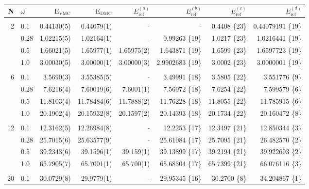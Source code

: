 \begin{table}
\begin{center}
\begin{tabular}{rl|rrrrrr}
    N     & $\omega$ & $\mathrm{E_{VMC}}$ & $\mathrm{E_{DMC}}$ & $E_\mathrm{ref}^{(a)}$& $E_\mathrm{ref}^{(b)}$ & $E_\mathrm{ref}^{(c)}$ & $E_\mathrm{ref}^{(d)}$\\
\hline\hline
\multicolumn{8}{c}{} \\
    2     &   0.1    & 0.44130(5)  & 0.44079(1)   & - 		&- 			& 0.4408 \{23\} & 0.44079191 \{19\}\\
          &   0.28   & 1.02215(5)  & 1.02164(1)   & -		&0.99263 \{19\} 	& 1.0217 \{23\}  & 1.0216441 \{19\}\\
          &   0.5    & 1.66021(5)  & 1.65977(1)   & 1.65975(2)&1.643871 \{19\}	& 1.6599 \{23\}  & 1.6597723 \{19\}\\
          &   1.0    & 3.00030(5)  & 3.00000(1)   & 3.00000(3)&2.9902683 \{19\}	& 3.0002 \{23\}  & 3.0000001 \{19\}\\
\cline{2-8}
\multicolumn{8}{c}{} \\
    6     &   0.1    &  3.5690(3)  &  3.55385(5)  & -		&3.49991 \{18\} 	& 3.5805 \{22\}  & 3.551776 \{9\}\\
          &   0.28   &  7.6216(4)  &  7.60019(6)  & 7.6001(1) &7.56972 \{18\} 	& 7.6254 \{22\}  & 7.599579 \{6\}\\
          &   0.5    & 11.8103(4)  & 11.78484(6)  & 11.7888(2)&11.76228 \{18\}	& 11.8055 \{22\} & 11.785915 \{6\}\\
          &   1.0    & 20.1902(4)  & 20.15932(8)  & 20.1597(2)&20.14393 \{18\}	& 20.1734 \{22\} & 20.160472 \{8\}\\
\cline{2-8}
\multicolumn{8}{c}{} \\
    12    &   0.1    & 12.3162(5)  & 12.26984(8)  & - 		&12.2253 \{17\} 	& 12.3497 \{21\} & 12.850344 \{3\}\\
          &   0.28   & 25.7015(6)  & 25.63577(9)  & - 		&25.61084 \{17\} 	& 25.7095 \{21\} & 26.482570 \{2\}\\
          &   0.5    & 39.2343(6)  & 39.1596(1)   & 39.159(1) &39.13899 \{17\}	& 39.2194 \{21\} & 39.922693 \{2\}\\
          &   1.0    & 65.7905(7)  & 65.7001(1)   & 65.700(1) &65.68304 \{17\}	& 65.7399 \{21\} & 66.076116 \{3\}\\
\cline{2-8}
\multicolumn{8}{c}{} \\
    20    &   0.1    &  30.0729(8)  &  29.9779(1) & -		&29.95345 \{16\}	& 30.2700 \{8\} & 34.204867 \{1\}\\

\end{tabular}
\end{center}
\end{table}
